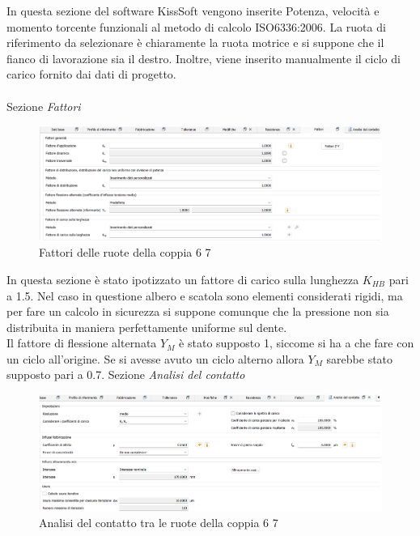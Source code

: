 In questa sezione del software KissSoft vengono inserite Potenza, velocità e momento torcente funzionali al metodo di calcolo ISO6336:2006. La ruota di riferimento da selezionare è chiaramente la ruota motrice e si suppone che il fianco di lavorazione sia il destro. Inoltre, viene inserito manualmente il ciclo di carico fornito dai dati di progetto.\\
\\
Sezione \emph{Fattori}
\begin{figure}[h]
    \centering
    \includegraphics[scale=0.5]{Immagini/FattoriCoppia67.png}
    \caption{Fattori delle ruote della coppia 6 7}
    \label{fig:FattoriCoppia67}
\end{figure}

In questa sezione è stato ipotizzato un fattore di carico sulla lunghezza $K_{HB}$ pari a 1.5. Nel caso in questione albero e scatola sono elementi considerati rigidi, ma per fare un calcolo in sicurezza si suppone comunque che la pressione non sia distribuita in maniera perfettamente uniforme sul dente.\\
Il fattore di flessione alternata $Y_M$ è stato supposto 1, siccome si ha a che fare con un ciclo all’origine. Se si avesse avuto un ciclo alterno allora $Y_M$ sarebbe stato supposto pari a 0.7.
\newpage
Sezione \emph{Analisi del contatto}
\begin{figure}[h]
    \centering
    \includegraphics[scale=0.5]{Immagini/AnalisiContattoCoppia67.png}
    \caption{Analisi del contatto tra le ruote della coppia 6 7}
    \label{fig:AnalisiContattoCoppia67}
\end{figure}


